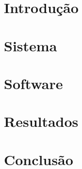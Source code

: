 \documentclass[a4paper]{scrartcl}
\begin{document}


\tableofcontents
{}
\pagebreak
{}
\setcounter{page}{1}

\section{Introdução}


\section{Sistema}
\label{sec:sistema}


\section{Software}


\section{Resultados}



\section{Conclusão}


\pagebreak

\listoffigures
\listoftables
\end{document}
